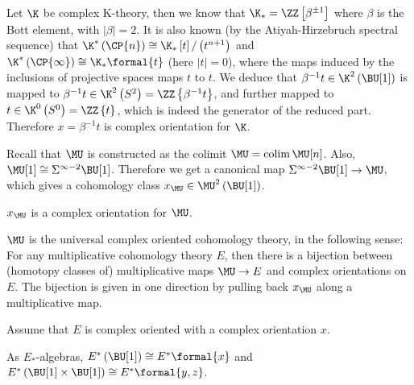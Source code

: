 \begin{example}\label{k-thy-oriented}
	Let $\K$ be complex K-theory, then we know that $\K_* = \ZZ\left[\beta^{\pm 1}\right]$ where $\beta$ is the Bott element, with $\left|\beta\right| = 2$.
	It is also known (by the Atiyah-Hirzebruch spectral sequence) that
	$\K^*\left(\CP{n}\right) \cong \K_* \left[t\right] / \left(t^{n+1}\right)$
	and
	$\K^*\left(\CP{\infty}\right) \cong \K_* \formal{t}$
	(here $\left|t\right| = 0$),
	where the maps induced by the inclusions of projective spaces maps $t$ to $t$.
	We deduce that $\beta^{-1} t \in \K^2\left(\BU[1]\right)$ is mapped to $\beta^{-1} t \in \K^2\left(S^2\right) = \ZZ\left\{\beta^{-1} t\right\}$, and further mapped to $t \in \K^0\left(S^0\right) = \ZZ\left\{t\right\}$, which is indeed the generator of the reduced part.
	Therefore $x = \beta^{-1} t$ is complex orientation for $\K$.
\end{example}

\begin{example}
	Recall that $\MU$ is constructed as the colimit $\MU = \colim \MU[n]$.
	Also, $\MU[1] \cong \Sigma^{\infty-2} \BU[1]$.
	Therefore we get a canonical map $\Sigma^{\infty-2} \BU[1] \to \MU$, which gives a cohomology class $x_{\MU} \in \MU^2\left(\BU[1]\right)$.
\end{example}

\begin{proposition}
	$x_{\MU}$ is a complex orientation for $\MU$.
\end{proposition}

\begin{theorem}
	$\MU$ is the universal complex oriented cohomology theory, in the following sense:
	For any multiplicative cohomology theory $E$, then there is a bijection between (homotopy classes of) multiplicative maps $\MU \to E$ and complex orientations on $E$.
	The bijection is given in one direction by pulling back $x_{\MU}$ along a multiplicative map.
\end{theorem}

Assume that $E$ is complex oriented with a complex orientation $x$.

\begin{proposition}
	As $E_*$-algebras,
	$E^*\left(\BU[1]\right) \cong E^*\formal{x}$
	and
	$E^*\left(\BU[1] \times \BU[1]\right) \cong E^*\formal{y,z}$.
\end{proposition}

